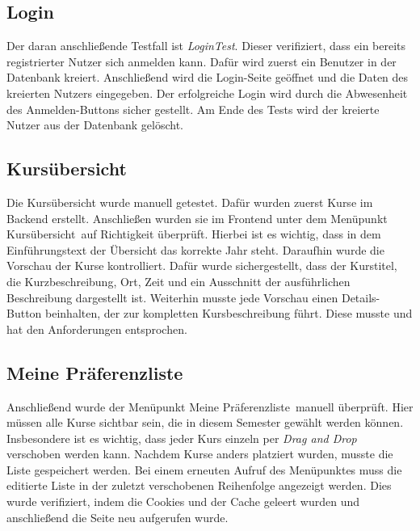 		\subsection{Login}
			Der daran anschließende Testfall ist \textit{LoginTest}.
			Dieser verifiziert, dass ein bereits registrierter Nutzer sich anmelden kann.
			Dafür wird zuerst ein Benutzer in der Datenbank kreiert.
			Anschließend wird die Login-Seite geöffnet und die Daten des kreierten Nutzers eingegeben.
			Der erfolgreiche Login wird durch die Abwesenheit des \glqq Anmelden\grqq -Buttons sicher gestellt.
			Am Ende des Tests wird der kreierte Nutzer aus der Datenbank gelöscht.\newline
		
		\subsection{Kursübersicht}
			Die Kursübersicht wurde manuell getestet.
			Dafür wurden zuerst Kurse im Backend erstellt.
			Anschließen wurden sie im Frontend unter dem Menüpunkt \glqq Kursübersicht\grqq~auf Richtigkeit überprüft.
			Hierbei ist es wichtig, dass in dem Einführungstext der Übersicht das korrekte Jahr steht.
			Daraufhin wurde die Vorschau der Kurse kontrolliert.
			Dafür wurde sichergestellt, dass der Kurstitel, die Kurzbeschreibung, Ort, Zeit und ein Ausschnitt der ausführlichen Beschreibung dargestellt ist.
			Weiterhin musste jede Vorschau einen \glqq Details\grqq -Button beinhalten, der zur kompletten Kursbeschreibung führt.
			Diese musste und hat den Anforderungen entsprochen.\newline
		
		\subsection{Meine Präferenzliste}
			Anschließend wurde der Menüpunkt \glqq Meine Präferenzliste\grqq~manuell überprüft.
			Hier müssen alle Kurse sichtbar sein, die in diesem Semester gewählt werden können.
			Insbesondere ist es wichtig, dass jeder Kurs einzeln per \textit{Drag and Drop} verschoben werden kann.
			Nachdem Kurse anders platziert wurden, musste die Liste gespeichert werden.\newline
			Bei einem erneuten Aufruf des Menüpunktes muss die editierte Liste in der zuletzt verschobenen Reihenfolge angezeigt werden.
			Dies wurde verifiziert, indem die Cookies und der Cache geleert wurden und anschließend die Seite neu aufgerufen wurde.\newline
		

